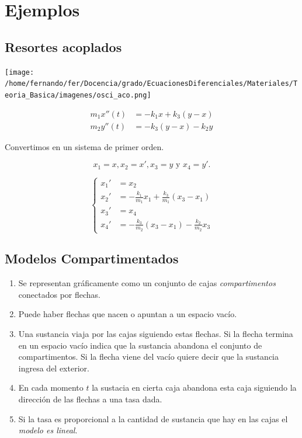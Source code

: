 \section{Ejemplos}


 \subsection{Resortes acoplados}
 

\texttt{[image: /home/fernando/fer/Docencia/grado/EcuacionesDiferenciales/Materiales/Teoria\_Basica/imagenes/osci\_aco.png]}



\begin{equation}
\begin{split} 
             m_1x''(t)&=-k_1x +k_3(y-x) \\
             m_2y''(t)&=-k_3(y-x)-k_2y 
\end{split}\tag{SL}
\end{equation}
 
 
Convertimos en un sistema de primer orden.

$$x_1=x, x_2=x', x_3=y \text{ y } x_4=y'.$$

\begin{equation} 
\left\{
\begin{split} 
            x_1'&=x_2\\
            x_2'&=-\frac{k_1}{m_1}x_1 +\frac{k_3}{m_1}(x_3-x_1) \\
            x_3'&=x_4\\
            x_4'&=-\frac{k_3}{m_2}(x_3-x_1)-\frac{k_2}{m_2}x_3 
\end{split} 
\right.
\end{equation}

\subsection{Modelos Compartimentados}
 
 
 \begin{enumerate}
  \item Se representan gráficamente como un conjunto de cajas \emph{compartimentos} conectados por flechas. 
  \item Puede haber flechas que nacen o  apuntan a un espacio vacío.
 \item Una sustancia viaja por las cajas siguiendo estas flechas. Si la flecha termina en un espacio vacío indica que la sustancia abandona el conjunto de compartimentos. Si la flecha viene del vacío quiere decir que la sustancia ingresa del exterior.
 \item  En cada momento $t$ la sustacia  en cierta caja abandona esta caja siguiendo la dirección de las flechas a una tasa dada.
 \item Si la tasa es proporcional a la cantidad de sustancia que hay en las cajas el \emph{modelo es lineal}.
 \end{enumerate}
 


